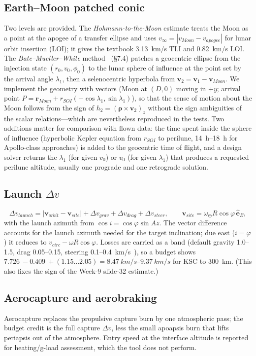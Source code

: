 \documentclass[11pt,a4paper]{article}
\newcommand{\dv}{\Delta v}
\newcommand{\vinf}{v_\infty}
\begin{document}
\subsection{Earth--Moon patched conic}
Two levels are provided. The \emph{Hohmann-to-the-Moon} estimate treats the Moon as a point at
the apogee of a transfer ellipse and uses $\vinf=|v_{Moon}-v_{apogee}|$ for lunar orbit
insertion (LOI); it gives the textbook \SI{3.13}{km/s} TLI and \SI{0.82}{km/s} LOI. The
\emph{Bate--Mueller--White} method~\cite{bmw} (\S7.4) patches a geocentric ellipse from the
injection state $(r_0,v_0,\phi_0)$ to the lunar sphere of influence at the point set by the
arrival angle $\lambda_1$, then a selenocentric hyperbola from $\bm v_2=\bm v_1-\bm v_{Moon}$.
We implement the geometry with vectors (Moon at $(D,0)$ moving in $+y$; arrival point
$P=\bm r_{Moon}+r_{SOI}(-\cos\lambda_1,\sin\lambda_1)$), so that the sense of motion about the
Moon follows from the sign of $h_2=(\bm\rho\times\bm v_2)_z$ without the sign ambiguities
of the scalar relations---which are nevertheless reproduced in the tests. Two additions
matter for comparison with flown data: the time spent inside the sphere of influence
(hyperbolic Kepler equation from $r_{SOI}$ to perilune, \SIrange{14}{18}{h} for Apollo-class
approaches) is added to the geocentric time of flight, and a design solver returns the
$\lambda_1$ (for given $v_0$) or $v_0$ (for given $\lambda_1$) that produces a requested
perilune altitude, usually one prograde and one retrograde solution.

\subsection{Launch $\dv$}
\begin{equation}
\dv_{launch}=\big|\bm v_{orbit}-\bm v_{site}\big|+\dv_{grav}+\dv_{drag}+\dv_{steer},\qquad
\bm v_{site}=\omega_\oplus R\cos\varphi\,\hat{\bm e}_E,
\end{equation}
with the launch azimuth from $\cos i=\cos\varphi\sin Az$.
The vector difference accounts for the launch azimuth needed for the target inclination;
due east ($i=\varphi$) it reduces to $v_{circ}-\omega R\cos\varphi$. Losses are carried as a
band (default gravity 1.0--1.5, drag 0.05--0.15, steering 0.1--0.4~km/s~\cite{sutton}), so a
budget shows $\SI{7.726}{}-\SI{0.409}{}+(1.15\ldots2.05)=\SIrange{8.47}{9.37}{km/s}$ for KSC to
\SI{300}{km}. (This also fixes the sign of the Week-9 slide-32 estimate.)

\subsection{Aerocapture and aerobraking}
Aerocapture replaces the propulsive capture burn by one atmospheric pass; the budget credit is
the full capture $\dv$, less the small apoapsis burn that lifts periapsis out of the atmosphere.
Entry speed at the interface altitude is reported for heating/g-load assessment, which the
tool does not perform.
\end{document}
